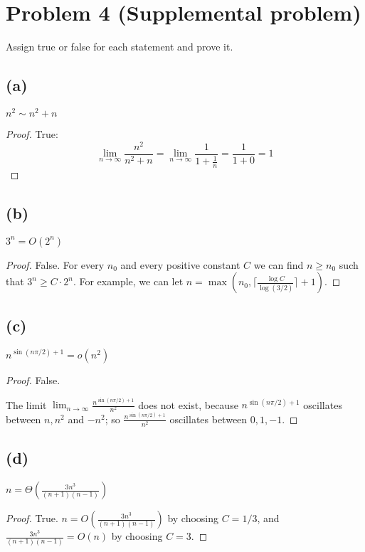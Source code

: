 \documentclass[14pt]{extarticle}
\newcommand{\dps}{\displaystyle}
\begin{document}
\section{Problem 4 (Supplemental problem)}
Assign true or false for each statement and prove it.

\subsection{(a)} $n^2 \sim n^2 + n$
\begin{proof}
True:
$$
\lim_{n\to\infty} \frac{n^2}{n^2+n} = \lim_{n\to\infty} \frac{1}{1+\frac{1}{n}} = \frac{1}{1+0} = 1
$$
\end{proof}

\subsection{(b)} $3^n = O(2^n)$
\begin{proof}
False. For every $n_0$ and every positive constant $C$ we can find $n \geq n_0$ such that $3^n \geq C \cdot 2^n$. For example, we can let $n = \max(n_0, \lceil\frac{\log C}{\log (3/2)}\rceil + 1)$.
\end{proof}

\subsection{(c)} $n^{\sin(n\pi/2) + 1} = o(n^2)$
\begin{proof}
False. 

The limit $\dps\lim_{n \to \infty} \frac{n^{\sin(n\pi/2) + 1}}{n^2}$ does not exist, because $n^{\sin(n\pi/2) + 1}$ oscillates between $n, n^2$ and $-n^2$; so $\dps\frac{n^{\sin(n\pi/2) + 1}}{n^2}$ oscillates between $0, 1, -1$.
\end{proof}

\subsection{(d)} $\dps n = \Theta\left(\frac{3n^3}{(n+1)(n-1)}\right)$
\begin{proof}
True. $\dps n = O\left(\frac{3n^3}{(n+1)(n-1)}\right)$ by choosing $C = 1/3$, and $\dps\frac{3n^3}{(n+1)(n-1)}=O(n)$ by choosing $C = 3$.
\end{proof}
\end{document}

